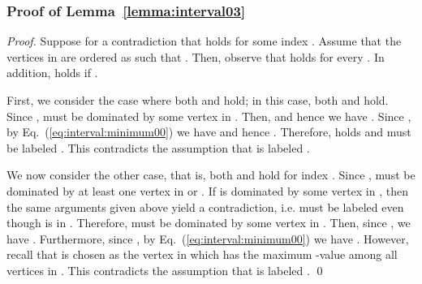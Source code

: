 \documentclass{llncs}
\begin{document}
\subsubsection{Proof of Lemma~\ref{lemma:interval03}}
\begin{proof}
Suppose for a contradiction that  holds for some index .
Assume that the vertices in  are ordered as 
such that .
Then, observe that  holds for every .
In addition,  holds if .

First, we consider the case where both  and  hold;
in this case, both  and  hold.
Since ,  must be
dominated by some vertex  in .
Then,  and hence we have .
Since , by Eq.~(\ref{eq:interval:minimum00}) we have 
and hence .
Therefore,  holds and  must be labeled .
This contradicts the assumption that  is labeled .

We now consider the other case, that is, both 
and  hold for index .
Since ,  must be dominated
by at least one vertex in  or .
If  is dominated by some vertex in , then the same arguments given
above yield a contradiction, i.e.  must be labeled  even though  is in .
Therefore,  must be dominated by some vertex  in .
Then, since , we have .
Furthermore, since , by Eq.~(\ref{eq:interval:minimum00}) we have .
However, recall that  is chosen as the vertex in  which has the maximum -value among all vertices in .
This contradicts the assumption that  is labeled .
\qed
\end{proof}
\end{document}
